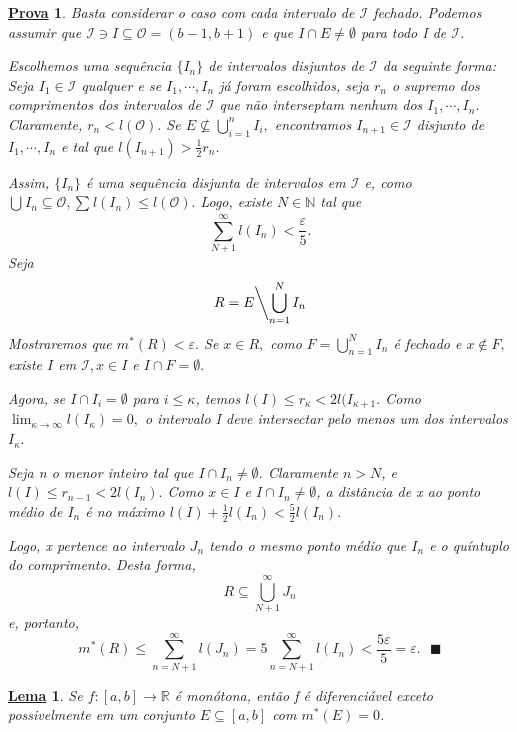 \documentclass{article}
\newtheorem*{lemma*}{\underline{Lema}}
\newtheorem*{proof*}{\underline{Prova}}
\renewcommand\qedsymbol{$\blacksquare$}
\begin{document}
\begin{proof*}
  Basta considerar o caso com cada intervalo de \(\mathcal{I}\) fechado. Podemos assumir que
  \(\mathcal{I}\ni I \subseteq{\mathcal{O}=(b-1, b+1)}\) e que \(I\cap E \neq\emptyset\) para todo I
  de \(\mathcal{I}\). 

  Escolhemos uma sequência \(\{I_{n}\}\) de intervalos disjuntos de \(\mathcal{I}\) da
  seguinte forma: Seja \(I_{1}\in \mathcal{I}\) qualquer e se \(I_{1}, \cdots, I_{n}\) já foram
  escolhidos, seja \(r_{n}\) o supremo dos comprimentos dos intervalos de \(\mathcal{I}\) que não interseptam
  nenhum dos \(I_{1}, \cdots, I_{n}\). Claramente, \(r_{n} <  l(\mathcal{O}).\) Se 
  \(E\not\subseteq{\bigcup_{i=1}^{n}{I_{i}}},\) encontramos \(I_{n+1}\in \mathcal{I}\)
  disjunto de \(I_{1}, \cdots, I_{n}\) e tal que \(l(I_{n+1}) > \frac{1}{2}r_{n}\).

  Assim, \(\{I_{n}\}\) é uma sequência disjunta de intervalos em \(\mathcal{I}\) e, como
  \(\bigcup_{}^{}{I_{n}\subseteq{\mathcal{O}}}, \sum\limits_{}^{}l(I_{n})\leq l(\mathcal{O}).\) Logo,
  existe \(N\in \mathbb{N}\) tal que 
    \[
      \sum\limits_{N+1}^{\infty} l(I_{n}) < \frac{\varepsilon }{5}.
    \]
  Seja 
    \[
      R = E\biggl\backslash\bigcup_{n=1}^{N}{I_{n}}\biggr.
    \]
  Mostraremos que \(m^{*}(R) < \varepsilon .\) Se \(x\in R,\) como \(F = \bigcup_{n=1}^{N}{I_{n}}\) é
  fechado e \(x\not\in F,\) existe \(I\) em \(\mathcal{I}, x\in I\) e \(I\cap F=\emptyset.\)

  Agora, se \(I\cap I_{i} = \emptyset\) para \(i\leq \kappa \), temos \(l(I)\leq r_{\kappa } < 2l(I_{\kappa +1}.\)
  Como \(\lim_{\kappa \to \infty}l(I_{\kappa }) = 0,\) o intervalo I deve intersectar
  pelo menos um dos intervalos \(I_{\kappa }.\)

  Seja n o menor inteiro tal que \(I\cap I_{n} \neq\emptyset\). Claramente \(n > N\), e
  \(l(I)\leq r_{n-1} < 2l(I_{n}).\) Como \(x\in I\) e \(I\cap I_{n} \neq\emptyset\), a distância de
  x ao ponto médio de \(I_{n}\) é no máximo \(l(I) + \frac{1}{2}l(I_{n}) < \frac{5}{2} l(I_{n}).\)

  Logo, x pertence ao intervalo \(J_{n}\) tendo o mesmo ponto médio que \(I_{n}\) e 
  o quíntuplo do comprimento. Desta forma, 
    \[
      R\subseteq{\bigcup_{N+1}^{\infty}{J_{n}}}
    \]
  e, portanto, 
    \[
      m^{*}(R)\leq \sum\limits_{n=N+1}^{\infty}l(J_{n}) = 5\sum\limits_{n=N+1}^{\infty}l(I_{n}) < \frac{5\varepsilon }{5} = \varepsilon .\text{ \qedsymbol}
    \]
\end{proof*}
\begin{lemma*}
  Se \(f:[a, b]\rightarrow \mathbb{R}\) é monótona, então f é diferenciável exceto 
  possivelmente em um conjunto \(E\subseteq{[a, b]}\) com \(m^{*}(E) = 0\).
\end{lemma*}
\end{document}
